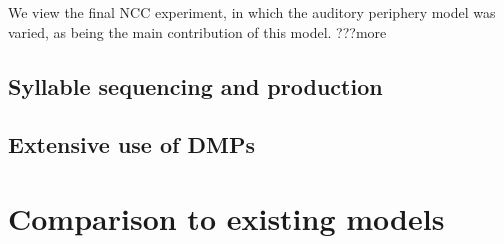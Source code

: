 We view the final NCC experiment,
in which the auditory periphery model was varied,
as being the main contribution
of this model.
???more

\subsection{Syllable sequencing and production}




\subsection{Extensive use of DMPs}






\section{Comparison to existing models}

